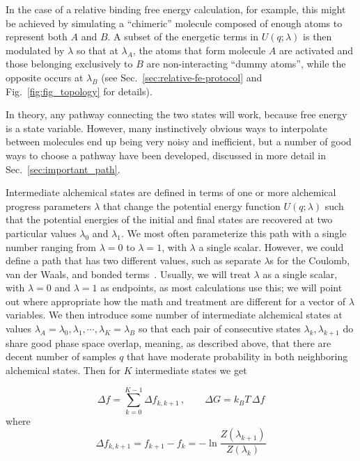 \documentclass[9pt,bestpractices]{livecoms}
\begin{document}
In the case of a relative binding free energy calculation, for example, this might be achieved by simulating a ``chimeric'' molecule composed of enough atoms to represent both $A$ and $B$. A subset of the energetic terms in $U(q;\lambda)$ is then modulated by $\lambda$ so that at $\lambda_A$, the atoms that form molecule $A$ are activated and those belonging exclusively to $B$ are non-interacting ``dummy atoms'', while the opposite occurs at $\lambda_B$ (see Sec.~\ref{sec:relative-fe-protocol} and Fig.~\ref{fig:fig_topology} for details).

In theory, any pathway connecting the two states will work, because free energy is a state variable.  However, many instinctively obvious ways to interpolate between molecules end up being very noisy and inefficient, but a number of good ways to choose a pathway have been developed, discussed in more detail in Sec.~\ref{sec:important_path}.

Intermediate alchemical states are defined in terms of one or more alchemical progress parameters $\lambda$ that change the potential energy function $U(q;\lambda)$ such that the potential energies of the initial and final states are recovered at two particular values $\lambda_0$ and $\lambda_1$. We most often parameterize this path with a single number ranging from $\lambda=0$ to $\lambda=1$, with $\lambda$ a single scalar.  However, we could define a path that has two different values, such as separate $\lambda$s for the Coulomb, van der Waals, and bonded terms~\cite{naden2014linear,naden2015linear}.  Usually, we will treat $\lambda$ as a single scalar, with $\lambda=0$ and $\lambda=1$ as endpoints, as most calculations use this; we will point out where appropriate how the math and treatment are different for a vector of $\lambda$ variables.  
We then introduce some number of intermediate alchemical states at values $\lambda_A = \lambda_0, \lambda_1, \cdots, \lambda_K = \lambda_B$ so that each pair of consecutive states $\lambda_k, \lambda_{k+1}$ do share good phase space overlap, meaning, as described above, that there are decent number of samples $q$ that have moderate probability in both neighboring alchemical states.  Then for $K$ intermediate states we get

\begin{equation}
    \Delta f = \sum_{k=0}^{K-1} \Delta f_{k,k+1} \, , \qquad \Delta G = k_BT \, \Delta f
\end{equation}
where
\begin{equation}
    \Delta f_{k,k+1} = f_{k+1} - f_{k} = -\ln\frac{Z(\lambda_{k+1})}{Z(\lambda_{k})}
\end{equation}
\end{document}
